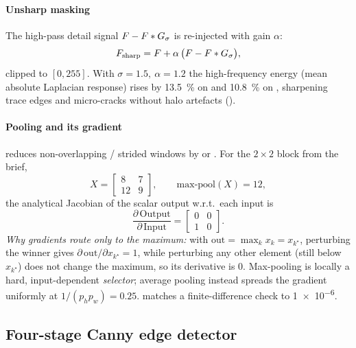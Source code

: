 \paragraph{Unsharp masking}
The high-pass detail signal $F - F* G_\sigma$ is re-injected with gain
$\alpha$:
\begin{equation}
  F_{\text{sharp}} = F + \alpha\,\bigl(F - F * G_\sigma\bigr),
  \label{eq:unsharp}
\end{equation}
clipped to $[0,255]$. With $\sigma=1.5,\ \alpha=1.2$ the high-frequency energy
(mean absolute Laplacian response) rises by \SI{13.5}{\percent} on \PCB{} and
\SI{10.8}{\percent} on \CRACK{}, sharpening trace edges and micro-cracks
without halo artefacts ().

\paragraph{Pooling and its gradient}
 reduces non-overlapping / strided windows by  or
. For the $2\times2$ block from the brief,
\begin{equation}
  X=\begin{bmatrix} 8 & 7\\ 12 & 9\end{bmatrix},\qquad
  \text{max-pool}(X)=12 ,
\end{equation}
the analytical Jacobian of the scalar output w.r.t.\ each input is
\begin{equation}
  \frac{\partial\,\text{Output}}{\partial\,\text{Input}}
  =\begin{bmatrix} 0 & 0\\ 1 & 0\end{bmatrix}.
  \label{eq:maxpoolgrad}
\end{equation}
\emph{Why gradients route only to the maximum:} with
$\text{out}=\max_k x_k=x_{k^\star}$, perturbing the winner gives
$\partial\,\text{out}/\partial x_{k^\star}=1$, while perturbing any other
element (still below $x_{k^\star}$) does not change the maximum, so its
derivative is $0$. Max-pooling is locally a hard, input-dependent
\emph{selector}; average pooling instead spreads the gradient uniformly at
$1/(p_h p_w)=0.25$.  matches a finite-difference check to
\num{1e-6}.

\subsection{Four-stage Canny edge detector}
\label{sec:canny}

